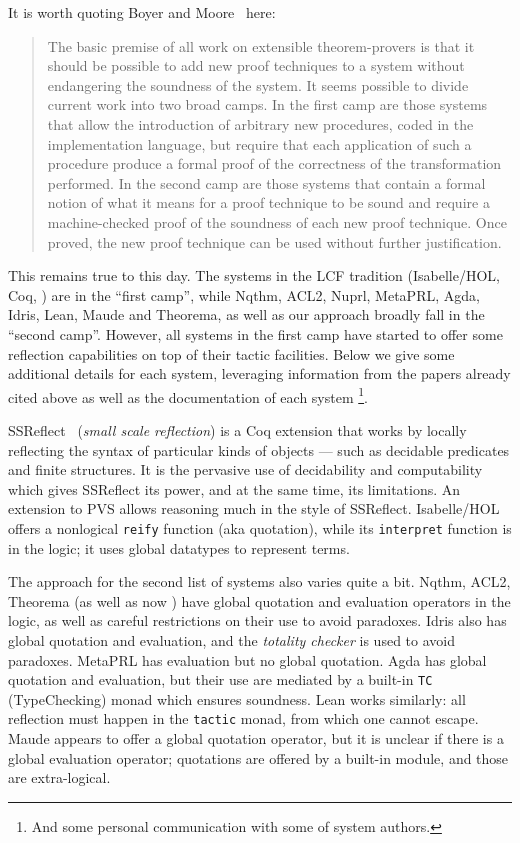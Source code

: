 \documentclass[fleqn]{llncs}
\begin{document}
It is worth quoting Boyer and Moore~\cite{BoyerMoore81} here:
\begin{quote}
The basic premise of all work on extensible
theorem-provers is that it should be possible to add new proof
techniques to a system without endangering the soundness of the system.
It seems possible to divide current work into two broad camps. In the
first camp are those systems that allow the introduction of arbitrary
new procedures, coded in the implementation language, but require that
each application of such a procedure produce a formal proof of the
correctness of the transformation performed. In the second camp are
those systems that contain a formal notion of what it means for a proof
technique to be sound and require a machine-checked proof of the
soundness of each new proof technique. Once proved, the new proof
technique can be used without further justification. 
\end{quote}
This remains true to this day. The systems in the LCF tradition (Isabelle/HOL,
Coq, \HL) are in the ``first camp'',
while Nqthm, ACL2, Nuprl, MetaPRL, Agda, Idris, Lean, Maude and Theorema, 
as well as our approach broadly fall in the ``second camp''. However,
all systems in the first camp have started to offer some reflection
capabilities on top of their tactic facilities. Below we give some 
additional details for each system, leveraging information from the papers 
already cited above as well as the documentation of each system%
\footnote{And some personal communication with some of system authors.}.

\textrm{SSReflect}~\cite{gonthier2010introduction} (\emph{small scale
reflection}) is a Coq extension that works by locally reflecting the
syntax of particular kinds of objects --- such as decidable predicates
and finite structures.  It is the pervasive use of decidability and
computability which gives \textrm{SSReflect} its power, and at the
same time, its limitations.  An extension to PVS allows reasoning much
in the style of \textrm{SSReflect}.  Isabelle/HOL offers a nonlogical
\texttt{reify} function (aka quotation), while its \texttt{interpret}
function is in the logic; it uses global datatypes to represent {\HOL}
terms.

The approach for the second list of systems also varies quite a bit.
Nqthm, ACL2, Theorema (as well as now \HLQE) have global quotation
and evaluation operators in the logic, as well as careful restrictions
on their use to avoid paradoxes. Idris also has global quotation and
evaluation, and the \emph{totality checker} is used to avoid
paradoxes. MetaPRL has evaluation but no global quotation. Agda
has global quotation and evaluation, but their use are mediated by
a built-in \texttt{TC} (TypeChecking) monad which ensures soundness.
Lean works similarly: all reflection must happen in the \texttt{tactic}
monad, from which one cannot escape. Maude appears to offer a global
quotation operator, but it is unclear if there is a global evaluation
operator; quotations are offered by a built-in module, and those are
extra-logical.
\end{document}
